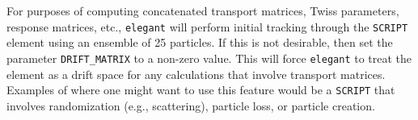 For purposes of computing concatenated transport matrices, Twiss
parameters, response matrices, etc., {\tt elegant} will perform
initial tracking through the \verb|SCRIPT| element using an ensemble
of 25 particles.  If this is not desirable, then set the parameter
\verb|DRIFT_MATRIX| to a non-zero value.  This will force
\verb|elegant| to treat the element as a drift space for any
calculations that involve transport matrices.  Examples of where one
might want to use this feature would be a \verb|SCRIPT| that involves
randomization (e.g., scattering), particle loss, or particle creation.

